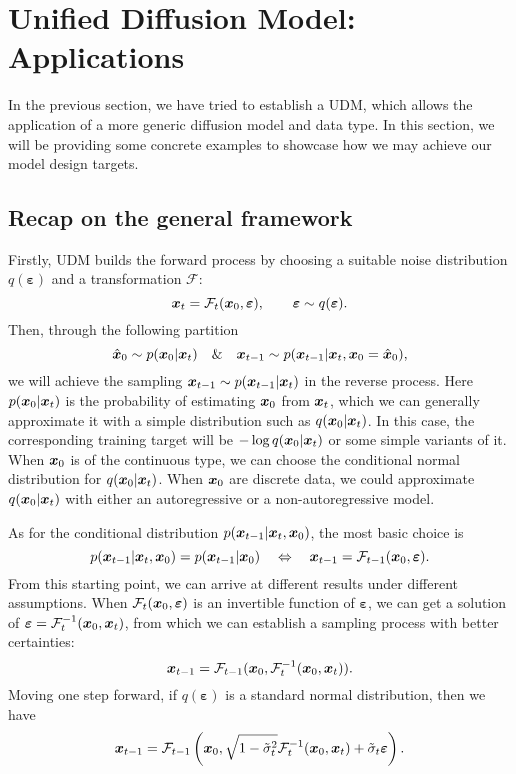 \section{Unified Diffusion Model: Applications}

In the previous section, we have tried to establish a UDM, which allows the application of a more generic diffusion model and data type. In this section, we will be providing some concrete examples to showcase how we may achieve our model design targets.

\subsection{Recap on the general framework}
Firstly, UDM builds the forward process by choosing a suitable noise distribution $q(\bm{\varepsilon})$ and a transformation $\mathcal{F}$:
\begin{equation}
    \label{eq:11.1}
\bm{x}_{t}=\mathcal{F}_t(\bm{x}_0,\bm{\varepsilon}),\qquad \bm{\varepsilon}\sim q(\bm{\varepsilon}).
\end{equation}
Then, through the following partition 
\begin{equation}
    \label{eq:11.2}
    \hat{\bm{x}}_0\sim p(\bm{x}_0|\bm{x}_{t})\quad \& \quad \bm{x}_{t-1}\sim p(\bm{x}_{t-1}|\bm{x}_{t},\bm{x}_0=\hat{\bm{x}}_0),
\end{equation}
we will achieve the sampling $\bm{x}_{t-1}\sim p(\bm{x}_{t-1}|\bm{x}_{t})$ in the reverse process. Here $p(\bm{x}_0|\bm{x}_{t})$ is the probability of estimating $\bm{x}_0$ from $\bm{x}_{t}$, which we can generally approximate it with a simple distribution such as $q(\bm{x}_0|\bm{x}_{t})$. In this case, the corresponding training target will be $-\log q(\bm{x}_0|\bm{x}_{t})$ or some simple variants of it. When $\bm{x}_0$ is of the continuous type, we can choose the conditional normal distribution for $q(\bm{x}_0|\bm{x}_{t})$. When $\bm{x}_0$ are discrete data, we could approximate $q(\bm{x}_0|\bm{x}_{t})$ with either an autoregressive or a non-autoregressive model.

As for the conditional distribution $p(\bm{x}_{t-1}|\bm{x}_{t},\bm{x}_0)$, the most basic choice is
\begin{equation}
    \label{eq:11.3}
    p(\bm{x}_{t-1}|\bm{x}_{t},\bm{x}_0) =p(\bm{x}_{t-1}|\bm{x}_0) \quad \Leftrightarrow \quad \bm{x}_{t-1}=\mathcal{F}_{t-1}(\bm{x}_0,\bm{\varepsilon}).
\end{equation}
From this starting point, we can arrive at different results under different assumptions. When $\mathcal{F}_t(\bm{x}_0,\bm{\varepsilon})$ is an invertible function of $\bm{\varepsilon}$, we can get a solution of $\bm{\varepsilon}=\mathcal{F}_t^{-1}(\bm{x}_0,\bm{x}_{t})$, from which we can establish a sampling process with better certainties:
\begin{equation}
    \label{eq:11.4}
    \bm{x}_{t-1} = \mathcal{F}_{t-1}(\bm{x}_0,\mathcal{F}_t^{-1}(\bm{x}_0,\bm{x}_{t})).
\end{equation}
Moving one step forward, if $q(\bm{\varepsilon})$ is a standard normal distribution, then we have 
\begin{equation}
    \label{eq:11.5}
    \bm{x}_{t-1}=\mathcal{F}_{t-1}\left(\bm{x}_0, \sqrt{1-\tilde{\sigma}_t^2} \mathcal{F}_t^{-1}(\bm{x}_0,\bm{x}_{t}) + \tilde{\sigma}_t\bm{\varepsilon}\right).
\end{equation}

